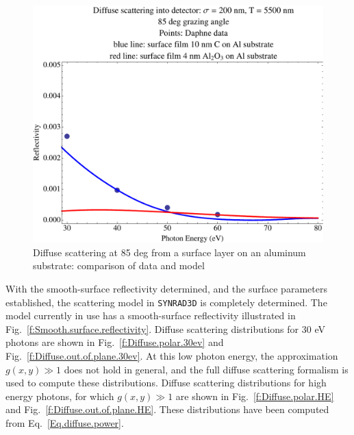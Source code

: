\documentclass[11pt]{article}
\newcommand{\srthree}{\texttt{SYNRAD3D}\xspace}
\begin{document}
      \begin{figure}
  \centering
  \includegraphics[width=4.5in]{Daphne-fit-85-deg}
   \caption{\label{f:Daphne.fit.85.deg}
   Diffuse scattering at 85 deg from a surface layer on an aluminum substrate: comparison of data and model}
   \end{figure}
   
With the smooth-surface reflectivity determined, and the surface
parameters established, the scattering model in \srthree is
completely determined. The model currently in use has a smooth-surface
reflectivity illustrated in
Fig.~\ref{f:Smooth.surface.reflectivity}. Diffuse
scattering distributions for 30 eV photons are shown in
Fig.~\ref{f:Diffuse.polar.30ev} and
Fig.~\ref{f:Diffuse.out.of.plane.30ev}. At this low photon
energy, the approximation $g(x,y)\gg 1$ does not hold in general, and
the full diffuse scattering formalism is used to compute these
distributions. Diffuse scattering distributions for high energy
photons, for which $g(x,y)\gg 1$ are shown in
Fig.~\ref{f:Diffuse.polar.HE} and
Fig.~\ref{f:Diffuse.out.of.plane.HE}. These distributions
have been computed from Eq.~\ref{Eq.diffuse.power}.
\end{document}
